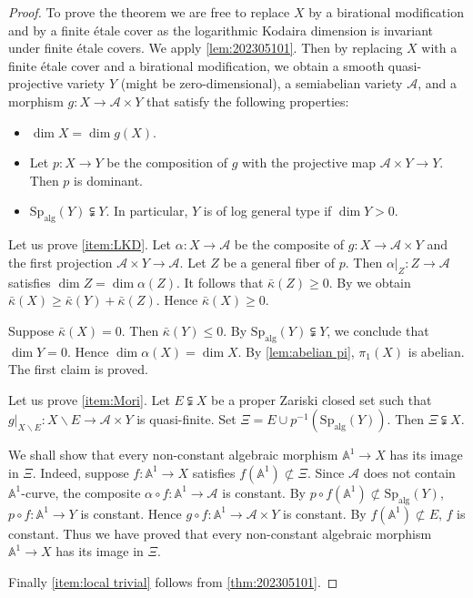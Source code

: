 \documentclass[11pt,english]{smfart}
\theoremstyle{plain}
\theoremstyle{definition}
\theoremstyle{remark}
\numberwithin{equation}{subsection}
\theoremstyle{plain}
\newcommand{\cA}{\mathcal A}
\newcommand{\bA}{\mathbb{A}}
\newcommand{\Spalg}{\mathrm{Sp}_{\mathrm{alg}}}
\begin{document}
\begin{proof}
	To prove the theorem we are free to replace $X$ by a birational modification  and by a finite \'etale cover as the logarithmic Kodaira dimension is invariant under finite \'etale covers. 
	We apply \cref{lem:202305101}.
Then by replacing $X$ with a finite \'etale cover and a birational modification, we obtain a smooth quasi-projective variety $Y$ (might be zero-dimensional), a semiabelian variety $\cA$, and a morphism $g:X\to \cA \times Y$ that satisfy the following properties:
	\begin{itemize}
		\item  $\dim X=\dim g(X)$.
		\item Let $p:X\to Y$ be  the composition of $g$ with the projective map $\cA\times Y\to Y$. 
		Then  $p$   is dominant.
		\item $\Spalg(Y)\subsetneqq Y$. In particular, $Y$ is of log general type if $\dim Y>0$.
	\end{itemize} 
	
	
	
	
	
	
	
	
	Let us  prove \cref{item:LKD}.
	Let $\alpha:X\to\cA$ be the composite of $g:X\to \cA\times Y$ and the first projection $\cA\times Y\to \cA$.
	Let  $Z$ be a general fiber of $p$. 
	Then $\alpha|_Z:Z\to \cA$ satisfies $\dim Z=\dim \alpha(Z)$. 
	It follows that $\bar{\kappa}(Z)\geq 0$. By\cite[Theorem 1.9]{Fuj17} we obtain $\bar{\kappa}(X)\geq \bar{\kappa}(Y)+\bar{\kappa}(Z)$.  
Hence $\bar{\kappa}(X)\geq 0$.

Suppose $\bar{\kappa}(X)= 0$.
Then $\bar{\kappa}(Y)\leq0$. 
By $\Spalg(Y)\subsetneqq Y$, we conclude that $\dim Y=0$.
Hence $\dim\alpha(X)=\dim X$.
By \cref{lem:abelian pi}, $\pi_1(X)$ is abelian.
The first claim is proved. 
	


	
	\medspace
	
Let us  prove \cref{item:Mori}.  
Let $E\subsetneqq X$ be a proper Zariski closed set such that $g|_{X\backslash E}:X\backslash E\to \cA\times Y$ is quasi-finite.
Set $\Xi=E\cup p^{-1}(\Spalg(Y))$.
Then $\Xi\subsetneqq X$.

We shall show that every non-constant algebraic morphism $\bA^1\to X$ has its image in $\Xi$.
Indeed, suppose $f:\bA^1\to X$ satisfies $f(\bA^1)\not\subset \Xi$.
Since $\cA$ does not contain $\bA^1$-curve, the composite $\alpha\circ f:\bA^1\to \cA$ is constant.
By $p\circ f(\bA^1)\not\subset \Spalg(Y)$, $p\circ f:\bA^1\to Y$ is constant.
Hence $g\circ f:\bA^1\to \cA\times Y$ is constant.
By $f(\bA^1)\not\subset E$, $f$ is constant.
Thus we have proved that every non-constant algebraic morphism $\bA^1\to X$ has its image in $\Xi$. 

Finally \cref{item:local trivial} follows from \cref{thm:202305101}.
\end{proof}
\end{document}
